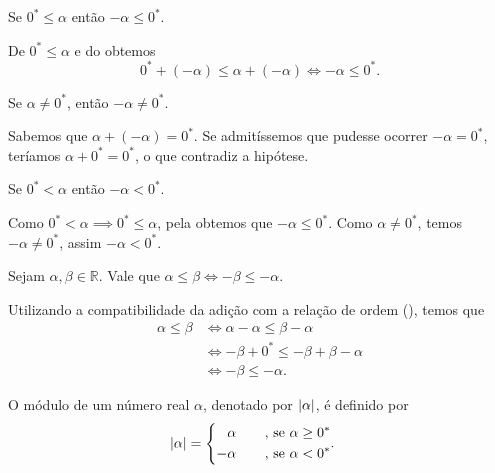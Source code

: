 \documentclass[../main.tex]{subfiles}
\begin{document}
\begin{prop}\label{reais-prop-xPositivoMenosxNegativo1}
    Se $0^* \leq \alpha$ então $-\alpha \leq 0^*$.
\end{prop}
\begin{dem}
    De $0^* \leq \alpha$ e do  obtemos \\ 
    \[ 0^* + (-\alpha) \leq \alpha + (-\alpha) \iff -\alpha \leq 0^*. \]
\end{dem}
\begin{prop}
    Se $\alpha \neq 0^*$, então $-\alpha \neq 0^*$.
\end{prop}
\begin{dem}
    Sabemos que $\alpha + (-\alpha) = 0^*$. Se admitíssemos que pudesse ocorrer $-\alpha = 0^*$, teríamos $\alpha + 0^* = 0^*$, o que contradiz a hipótese. 
\end{dem}
\begin{corol}\label{reais-corol-xPositivoMenosxNegativo1}
    Se $0^* < \alpha$ então $-\alpha < 0^*$.
\end{corol}
\begin{dem}
    Como $0^* < \alpha \implies 0^* \leq \alpha$, pela  obtemos que $-\alpha \leq 0^*$. Como $\alpha \neq 0^*$, temos $-\alpha \neq 0^*$, assim $-\alpha < 0^*$.
\end{dem}

\begin{teo}\label{reais-teo-desigualdadeSimetrico}
    Sejam $\alpha, \beta \in \mathbb{R}$. Vale que $\alpha \leq \beta \iff -\beta \leq -\alpha$.
\end{teo}
\begin{dem}
    Utilizando a compatibilidade da adição com a relação de ordem (), temos que 
    \begin{align*}
        \alpha \leq \beta
        &\iff \alpha - \alpha \leq \beta - \alpha \\
        &\iff -\beta + 0^* \leq - \beta + \beta - \alpha \\
        &\iff -\beta \leq -\alpha.
    \end{align*}
\end{dem}

\begin{defi}\label{reais-def-modulo1}
    O módulo de um número real $\alpha$, denotado por $\abs{\alpha}$, é definido por
    \begin{equation*}
        \abs{\alpha} = 
        \begin{cases}
        \begin{aligned}
             &\alpha \hspace{0.6cm} \text{ , se } \alpha \geq 0^* \\
            -&\alpha \hspace{0.6cm} \text{ , se } \alpha < 0^*
        \end{aligned}.
        \end{cases}            
    \end{equation*}
\end{defi}
\end{document}
